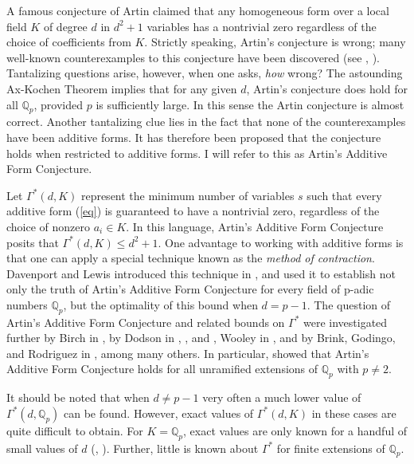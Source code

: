 \documentclass{article}
\begin{document}
A famous conjecture of Artin claimed that any homogeneous form over a local field $K$ of degree $d$ in $d^2+1$ variables has a nontrivial zero regardless of the choice of coefficients from $K$.  Strictly speaking, Artin's conjecture is wrong; many well-known counterexamples to this conjecture have been discovered (see \cite{MR197450}, \cite{greenberg1969lectures}).   Tantalizing questions arise, however, when one asks, \textit{how} wrong?  The astounding Ax-Kochen Theorem implies that for any given $d$, Artin's conjecture does hold for all $\mathbb{Q}_p$, provided $p$ is sufficiently large.  In this sense the Artin conjecture is almost correct.  Another tantalizing clue lies in the fact that none of the counterexamples have been additive forms.  It has therefore been proposed that the conjecture holds when restricted to additive forms.  I will refer to this as Artin's Additive Form Conjecture.

Let $\Gamma^*(d, K)$ represent the minimum number of variables $s$ such that every additive form (\ref{eq}) is guaranteed to have a nontrivial zero, regardless of the choice of nonzero $a_i \in K$.  In this language, Artin's Additive Form Conjecture posits that $\Gamma^*(d, K) \le d^2+1$. One advantage to working with additive forms is that one can apply a special technique known as the \textit{method of contraction}.  Davenport and Lewis introduced this technique in \cite{davenport1963homogeneous}, and used it to establish not only the truth of Artin's Additive Form Conjecture for every field of p-adic numbers $\mathbb{Q}_p$, but the optimality of this bound when $d=p-1$.  The question of Artin's Additive Form Conjecture and related bounds on $\Gamma^*$ were investigated further by Birch in \cite{birchdiagonal_MR167456}, by Dodson in \cite{dodson1_MR213296}, \cite{dodson2_MR382139}, and \cite{dodson3_MR649113}, Wooley in \cite{wooley_MR3365797}, and by Brink, Godingo, and Rodriguez in \cite{godinho_MR2413361}, among many others.  In particular, \cite{leep2018diagonal} showed that Artin's Additive Form Conjecture holds for all unramified extensions of $\mathbb{Q}_p$ with $p \ne 2$.


It should be noted that when $d \ne p-1$ very often a much lower value of $\Gamma^*(d, \mathbb{Q}_p)$ can be found.  However, exact values of $\Gamma^*(d, K)$ in these cases are quite difficult to obtain.  For $K = \mathbb{Q}_p$, exact values are only known for a handful of small values of $d$ (\cite{knappexact1_MR3998981}, \cite{knappexact2_MR2811557}).   Further, little is known about $\Gamma^*$ for finite extensions of $\mathbb{Q}_p$.
\end{document}
